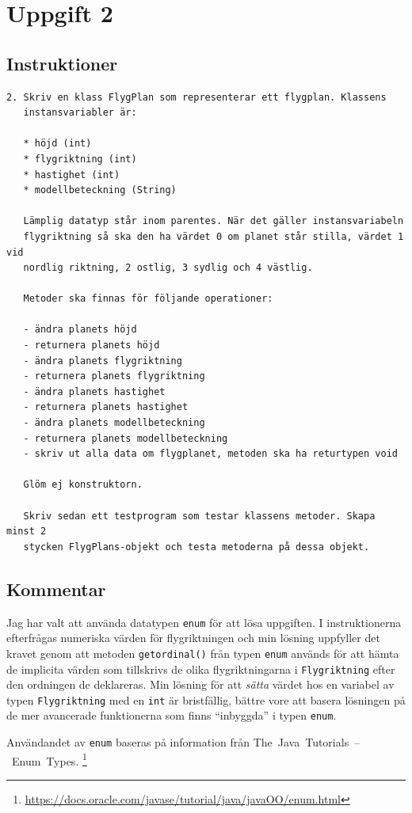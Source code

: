\section{Uppgift 2}\label{sec:uppg02}

\subsection{Instruktioner}
\begin{verbatim}
2. Skriv en klass FlygPlan som representerar ett flygplan. Klassens
   instansvariabler är:

   * höjd (int)
   * flygriktning (int)
   * hastighet (int)
   * modellbeteckning (String)

   Lämplig datatyp står inom parentes. När det gäller instansvariabeln
   flygriktning så ska den ha värdet 0 om planet står stilla, värdet 1 vid
   nordlig riktning, 2 ostlig, 3 sydlig och 4 västlig.

   Metoder ska finnas för följande operationer:

   - ändra planets höjd
   - returnera planets höjd
   - ändra planets flygriktning
   - returnera planets flygriktning
   - ändra planets hastighet
   - returnera planets hastighet
   - ändra planets modellbeteckning
   - returnera planets modellbeteckning
   - skriv ut alla data om flygplanet, metoden ska ha returtypen void

   Glöm ej konstruktorn.

   Skriv sedan ett testprogram som testar klassens metoder. Skapa minst 2
   stycken FlygPlans-objekt och testa metoderna på dessa objekt.
\end{verbatim}


\subsection{Kommentar}
Jag har valt att använda datatypen \texttt{enum} för att lösa uppgiften.  I
instruktionerna efterfrågas numeriska värden för flygriktningen och min lösning
uppfyller det kravet genom att metoden \texttt{getordinal()} från typen
\texttt{enum} används för att hämta de implicita värden som tillskrivs de olika
flygriktningarna i \texttt{Flygriktning} efter den ordningen de deklareras.
Min lösning för att \emph{sätta} värdet hos en variabel av typen
\texttt{Flygriktning} med en \texttt{int} är bristfällig, bättre vore att
basera lösningen på de mer avancerade funktionerna som finns ``inbyggda'' i
typen \texttt{enum}.

Användandet av \texttt{enum} baseras på information från
\mbox{The Java Tutorials -- Enum Types}.
\footnote{\url{https://docs.oracle.com/javase/tutorial/java/javaOO/enum.html}}


